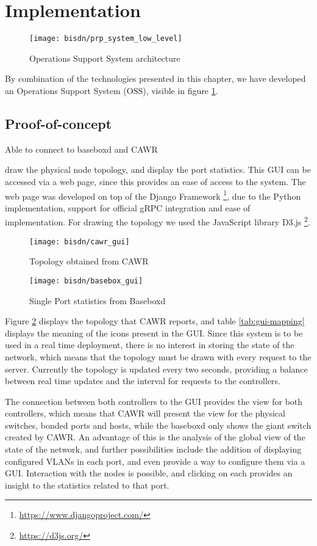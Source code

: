 \section {Implementation}

\begin{figure}
    \centering
    \texttt{[image: bisdn/prp\_system\_low\_level]}
    \caption{Operations Support System architecture}
    \label{fig:oss}
\end{figure}

By combination of the technologies presented in this chapter, we have developed an Operations Support System (OSS), visible in figure \ref{fig:oss}. 

\subsection{Proof-of-concept}

Able to connect to baseboxd and CAWR

draw the physical node topology, and display the port statistics. This GUI can be accessed via a web page, since this provides an ease of access to the system. 
The web page was developed on top of the Django Framework \footnote{\url{https://www.djangoproject.com/}}, due to the Python implementation, support for official
gRPC integration and ease of implementation. For drawing the topology we used the JavaScript library D3.js \footnote{\url{https://d3js.org/}}.

\begin{figure} [H]
        \centering
        \texttt{[image: bisdn/cawr\_gui]}
        \caption{Topology obtained from CAWR}
        \label{fig:cawr_gui}
\end{figure}

\begin{figure}
    \centering
    \texttt{[image: bisdn/basebox\_gui]}
    \caption{Single Port statistics from Baseboxd}
\end{figure}

\par Figure \ref{fig:cawr_gui} displays the topology that CAWR reports, and table \ref{tab:gui-mapping} displays the meaning of the icons present in the GUI. Since 
this system is to be used in a real time deployment, there is no interest in storing the state of the network, which means that the topology must be drawn with 
every request to the server. Currently the topology is updated every two seconds, providing a balance between real time updates and the interval for requests to the
controllers.

\par The connection between both controllers to the GUI provides the view for both controllers, which means that CAWR will present the view for the physical
switches, bonded ports and hosts, while the baseboxd only shows the giant switch created by CAWR. An advantage of this is the analysis of the global view of the
state of the network, and further possibilities include the addition of displaying configured VLANs in each port, and even provide a way to configure them via a GUI.
Interaction with the nodes is possible, and clicking on each provides an insight to the statistics related to that port.  
